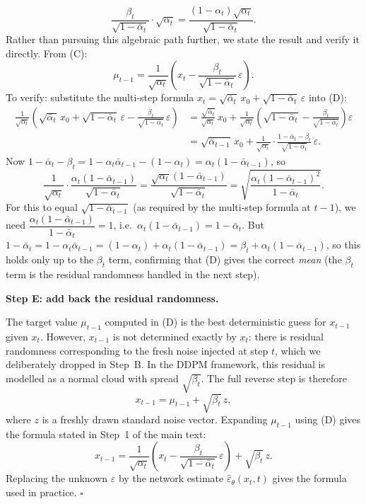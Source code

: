 \documentclass[11pt]{article}
\begin{document}
\begin{mdframed}[linewidth=1pt, frametitle={\textbf{Proof (for the curious reader): derivation of the reverse step}}]
\[
\frac{\beta_t}{\sqrt{1-\bar\alpha_t}} \cdot \sqrt{\alpha_t}
= \frac{(1-\alpha_t)\sqrt{\alpha_t}}{\sqrt{1-\bar\alpha_t}}.
\]
Rather than pursuing this algebraic path further, we state the result and verify it directly.
From (C):
\[
\mu_{t-1}
= \frac{1}{\sqrt{\alpha_t}}\!\left(x_t - \frac{\beta_t}{\sqrt{1-\bar\alpha_t}}\,\varepsilon\right).
\tag{D}
\]
To verify: substitute the multi-step formula $x_t = \sqrt{\bar\alpha_t}\,x_0 + \sqrt{1-\bar\alpha_t}\,\varepsilon$ into (D):
\begin{align*}
\frac{1}{\sqrt{\alpha_t}}\!\left(\sqrt{\bar\alpha_t}\,x_0 + \sqrt{1-\bar\alpha_t}\,\varepsilon - \frac{\beta_t}{\sqrt{1-\bar\alpha_t}}\,\varepsilon\right)
&= \frac{\sqrt{\bar\alpha_t}}{\sqrt{\alpha_t}}\,x_0
  + \frac{1}{\sqrt{\alpha_t}}\!\left(\sqrt{1-\bar\alpha_t} - \frac{\beta_t}{\sqrt{1-\bar\alpha_t}}\right)\varepsilon \\
&= \sqrt{\bar\alpha_{t-1}}\,x_0
  + \frac{1}{\sqrt{\alpha_t}}\cdot\frac{1-\bar\alpha_t - \beta_t}{\sqrt{1-\bar\alpha_t}}\,\varepsilon.
\end{align*}
Now $1-\bar\alpha_t - \beta_t = 1 - \alpha_t\bar\alpha_{t-1} - (1-\alpha_t) = \alpha_t(1-\bar\alpha_{t-1})$, so
\[
\frac{1}{\sqrt{\alpha_t}}\cdot\frac{\alpha_t(1-\bar\alpha_{t-1})}{\sqrt{1-\bar\alpha_t}}
= \frac{\sqrt{\alpha_t}(1-\bar\alpha_{t-1})}{\sqrt{1-\bar\alpha_t}}
= \sqrt{\frac{\alpha_t(1-\bar\alpha_{t-1})^2}{1-\bar\alpha_t}}.
\]
For this to equal $\sqrt{1-\bar\alpha_{t-1}}$ (as required by the multi-step formula at $t-1$), we need
$\dfrac{\alpha_t(1-\bar\alpha_{t-1})}{1-\bar\alpha_t} = 1$, i.e.\ $\alpha_t(1-\bar\alpha_{t-1}) = 1-\bar\alpha_t$.
But $1-\bar\alpha_t = 1-\alpha_t\bar\alpha_{t-1} = (1-\alpha_t) + \alpha_t(1-\bar\alpha_{t-1}) = \beta_t + \alpha_t(1-\bar\alpha_{t-1})$,
so this holds only up to the $\beta_t$ term, confirming that (D) gives the correct \emph{mean} (the $\beta_t$ term is the residual randomness handled in the next step).

\medskip\noindent
\textbf{Step E: add back the residual randomness.}

The target value $\mu_{t-1}$ computed in (D) is the best deterministic guess for $x_{t-1}$ given $x_t$.
However, $x_{t-1}$ is not determined exactly by $x_t$: there is residual randomness corresponding to the fresh noise injected at step $t$, which we deliberately dropped in Step~B.
In the DDPM framework, this residual is modelled as a normal cloud with spread $\sqrt{\beta_t}$.
The full reverse step is therefore
\[
x_{t-1} = \mu_{t-1} + \sqrt{\beta_t}\,z,
\]
where $z$ is a freshly drawn standard noise vector.
Expanding $\mu_{t-1}$ using (D) gives the formula stated in Step~1 of the main text:
\[
x_{t-1}
= \frac{1}{\sqrt{\alpha_t}}\!\left(x_t - \frac{\beta_t}{\sqrt{1-\bar\alpha_t}}\,\varepsilon\right) + \sqrt{\beta_t}\,z.
\]
Replacing the unknown $\varepsilon$ by the network estimate $\widehat\varepsilon_\theta(x_t,t)$ gives the formula used in practice. \hfill$\square$
\end{mdframed}
\end{document}

